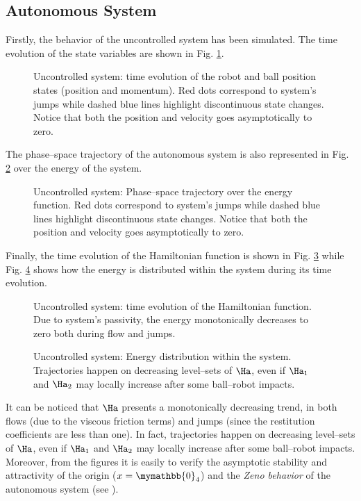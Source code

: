 \subsection{Autonomous System}
%
Firstly, the behavior of the uncontrolled system has been simulated. The time evolution of the state variables are shown in Fig. \ref{fig:aut1}.
%
\begin{figure}[!ht]
	\centering
	\caption[Uncontrolled system: time evolution of the robot and ball position states]{Uncontrolled system: time evolution of the robot and ball position states (position and momentum). Red dots correspond to system's jumps while dashed blue lines highlight discontinuous state changes. Notice that both the position and velocity goes asymptotically to zero.}
	\label{fig:aut1}
\end{figure}
%
The phase--space trajectory of the autonomous system is also represented in Fig. \ref{fig:aut2} over the energy of the system. 
%
\begin{figure}[!ht]
	\centering
	\caption[Uncontrolled system: Phase--space trajectory over the energy function]{Uncontrolled system: Phase--space trajectory over the energy function. Red dots correspond to system's jumps while dashed blue lines highlight discontinuous state changes. Notice that both the position and velocity goes asymptotically to zero.}
	\label{fig:aut2}
\end{figure}
%
Finally, the time evolution of the Hamiltonian function is shown in Fig. \ref{fig:aut3} while Fig. \ref{fig:aut4} shows how the energy is distributed within the system during its time evolution.
%
\begin{figure}[!ht]
	\centering
	\caption[Uncontrolled system: time evolution of the Hamiltonian function.]{Uncontrolled system: time evolution of the Hamiltonian function. Due to system's passivity, the energy monotonically decreases to zero both during flow and jumps.}
	\label{fig:aut3}
\end{figure}
%
\begin{figure}[!ht]
	\centering
	\caption[Uncontrolled system: Energy distribution within the system.]{Uncontrolled system: Energy distribution within the system. Trajectories happen on decreasing level--sets of $\Ha$, even if $\Ha_1$ and $\Ha_2$ may locally increase after some ball--robot impacts.}
	\label{fig:aut4}
\end{figure}
%
%
It can be noticed that $\Ha$ presents a monotonically decreasing trend, in both flows (due to the viscous friction terms) and jumps (since the restitution coefficients are less than one). In fact, trajectories happen on decreasing level--sets of $\Ha$, even if $\Ha_1$ and $\Ha_2$ may locally increase after some ball--robot impacts. Moreover, from the figures it is easily to verify the asymptotic stability and attractivity of the origin ($x = \mymathbb{0}_4$) and the \textit{Zeno behavior} of the autonomous system (see \cite{goebel2009hybrid}).
